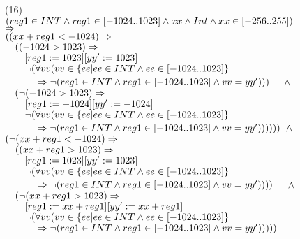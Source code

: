 \bigskip\noindent
(16)\\
$(reg1\in INT\et reg1\in[-1024..1023]\et xx\et Int\et xx\in[-256..255])$\\
$\fleche$\\
$(({xx+reg1} < -1024)\fleche$\\
$\tab{1em}((-1024 > 1023)\fleche$\\
$\tab{2em}[reg1:=1023][yy' := 1023]$\\
$\tab{2em}\neg(\forall vv (vv\in \{ ee | ee\in INT \et ee\in [-1024..1023] \}$\\
$\tab{3em}\fleche\neg(reg1\in INT\et reg1\in[-1024..1023]\et vv = yy')))$
$\tab{1em}\et$\\
$\tab{1em}(\neg(-1024 > 1023)\fleche$\\
$\tab{2em}[reg1:=-1024][yy' := -1024]$\\
$\tab{2em}\neg(\forall vv (vv\in \{ ee | ee\in INT \et ee\in [-1024..1023] \}$\\
$\tab{3em}\fleche\neg(reg1\in INT\et reg1\in[-1024..1023]\et vv = yy'))))))$
$\et$\\
$(\neg({xx+reg1} < -1024)\fleche$\\
$\tab{1em}(({xx+reg1} > 1023)\fleche$\\
$\tab{2em}[reg1:=1023][yy' := 1023]$\\
$\tab{2em}\neg(\forall vv (vv\in \{ ee | ee\in INT \et ee\in [-1024..1023] \}$\\
$\tab{3em}\fleche\neg(reg1\in INT\et reg1\in[-1024..1023]\et vv = yy'))))$
$\tab{1em}\et$\\
$\tab{1em}(\neg( {xx+reg1} > 1023)\fleche$\\
$\tab{2em}[reg1 := {xx+reg1}][yy' := {xx+reg1}]$\\
$\tab{2em}\neg(\forall vv (vv\in \{ ee | ee\in INT \et ee\in [-1024..1023] \}$\\
$\tab{3em}\fleche\neg(reg1\in INT\et reg1\in[-1024..1023]\et vv = yy')))))$

